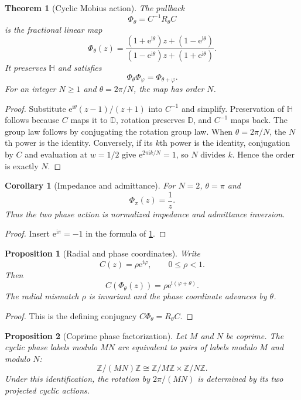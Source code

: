 \documentclass[11pt,letterpaper]{article}
\newtheorem{theorem}{Theorem}[section]
\theoremstyle{plain}
\newtheorem{proposition}[proposition]{Proposition}
\theoremstyle{plain}
\theoremstyle{plain}
\newtheorem{corollary}[corollary]{Corollary}
\theoremstyle{definition}
\theoremstyle{definition}
\theoremstyle{definition}
\theoremstyle{definition}
\theoremstyle{remark}
\theoremstyle{remark}
\theoremstyle{remark}
\theoremstyle{remark}
\newcommand{\ii}{\mathrm i}
\newcommand{\ZZ}{\mathbb Z}
\newcommand{\e}{\mathrm e}
\begin{document}
\begin{theorem}[Cyclic Mobius action]\label{thm:cyclic_mobius}
The pullback
\[
\Phi_\theta
=C^{-1}R_\theta C
\]
is the fractional linear map
\[
\boxed{
\Phi_\theta(z)
=
\frac{(1+\e^{\ii\theta})z+(1-\e^{\ii\theta})}
{(1-\e^{\ii\theta})z+(1+\e^{\ii\theta})}.
}
\]
It preserves \(\mathbb H\) and satisfies
\[
\Phi_\theta\Phi_\varphi
=
\Phi_{\theta+\varphi}.
\]
For an integer \(N\geq1\) and \(\theta=2\pi/N\), the map has order \(N\).
\end{theorem}

\begin{proof}
Substitute \(\e^{\ii\theta}(z-1)/(z+1)\) into \(C^{-1}\) and simplify. Preservation of \(\mathbb H\) follows because \(C\) maps it to \(\mathbb D\), rotation preserves \(\mathbb D\), and \(C^{-1}\) maps back. The group law follows by conjugating the rotation group law. When \(\theta=2\pi/N\), the \(N\)th power is the identity. Conversely, if its \(k\)th power is the identity, conjugation by \(C\) and evaluation at \(w=1/2\) give \(\e^{2\pi\ii k/N}=1\), so \(N\) divides \(k\). Hence the order is exactly \(N\).
\end{proof}

\begin{corollary}[Impedance and admittance]\label{cor:impedance_admittance}
For \(N=2\), \(\theta=\pi\) and
\[
\Phi_\pi(z)=\frac1z.
\]
Thus the two phase action is normalized impedance and admittance inversion.
\end{corollary}

\begin{proof}
Insert \(\e^{\ii\pi}=-1\) in the formula of \cref{thm:cyclic_mobius}.
\end{proof}

\begin{proposition}[Radial and phase coordinates]\label{prop:radial_phase}
Write
\[
C(z)=\rho\e^{\ii\varphi},
\qquad
0\leq\rho<1.
\]
Then
\[
C(\Phi_\theta(z))
=
\rho\e^{\ii(\varphi+\theta)}.
\]
The radial mismatch \(\rho\) is invariant and the phase coordinate advances by \(\theta\).
\end{proposition}

\begin{proof}
This is the defining conjugacy \(C\Phi_\theta=R_\theta C\).
\end{proof}

\begin{proposition}[Coprime phase factorization]\label{prop:phase_factorization}
Let \(M\) and \(N\) be coprime. The cyclic phase labels modulo \(MN\) are equivalent to pairs of labels modulo \(M\) and modulo \(N\):
\[
\ZZ/(MN)\ZZ
\cong
\ZZ/M\ZZ\times\ZZ/N\ZZ.
\]
Under this identification, the rotation by \(2\pi/(MN)\) is determined by its two projected cyclic actions.
\end{proposition}
\end{document}
